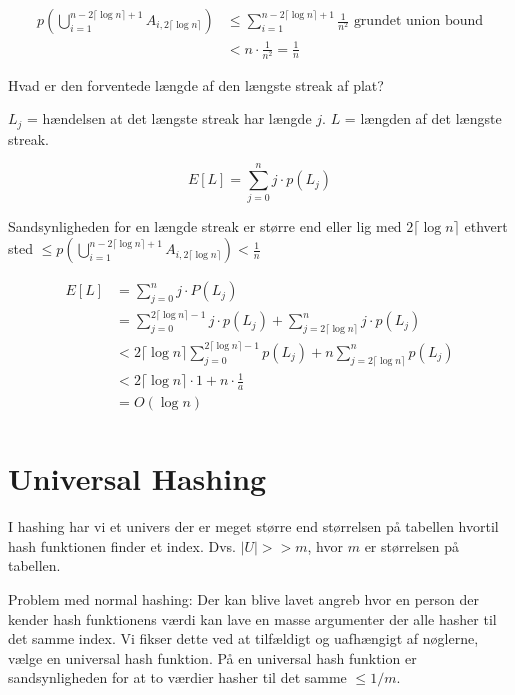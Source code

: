 \documentclass[11pt]{article}
\theoremstyle{definition}
\theoremstyle{remark}
\begin{document}
\begin{equation}
  \label{}
\begin{split}
  p(\bigcup\limits_{i=1}^{n- 2 \lceil \log n \rceil +1}A_{i, 2 \lceil \log n \rceil}) &\leq  \sum_{i=1}^{n - 2 \lceil \log n \rceil +1} \frac{1}{n^{2}} \text{ grundet union bound}\\
  &< n \cdot \frac{1}{n^{2}} = \frac{1}{n}
\end{split}
\end{equation}

Hvad er den forventede længde af den længste streak af plat?

$L_{j}$ = hændelsen at det længste streak har længde $j$. $L$ = længden af det længste streak.

\[
E[L] = \sum_{j=0}^{n} j \cdot p (L_{j})
\]

Sandsynligheden for en længde streak er større end eller lig med $2 \lceil \log n \rceil$ ethvert sted $\leq p ( \bigcup\limits_{i=1}^{n-2 \lceil \log n \rceil + 1} A_{i, 2 \lceil \log n \rceil} ) < \frac{1}{n}$

\begin{equation}
\begin{split}

  E[L] &= \sum_{j=0}^{n} j \cdot P(L_{j}) \\
       &=  \sum_{j=0}^{2 \lceil \log n \rceil - 1}j \cdot p(L_{j}) + \sum_{j= 2 \lceil \log n \rceil}^{n} j \cdot p(L_{j}) \\
       &< 2 \lceil \log n \rceil \sum_{j=0}^{2 \lceil \log n \rceil - 1} p(L_{j}) + n \sum_{j=2 \lceil \log n \rceil}^{n} p(L_{j}) \\
       &< 2 \lceil \log n \rceil \cdot 1 + n \cdot \frac{1}{a}\\
       &= O(\log n)\\
\end{split}
\end{equation}


\newpage

\section{Universal Hashing}
\label{sec:hashing}


I hashing har vi et univers der er meget større end størrelsen på tabellen hvortil hash funktionen finder et index. Dvs. $|U| >> m$, hvor $m$ er størrelsen på tabellen.

Problem med normal hashing: Der kan blive lavet angreb hvor en person der kender hash funktionens værdi kan lave en masse argumenter der alle hasher til det samme index. Vi fikser dette ved at tilfældigt og uafhængigt af nøglerne, vælge en universal hash funktion. På en universal hash funktion er sandsynligheden for at to værdier hasher til det samme $\leq 1/m$.
\end{document}
